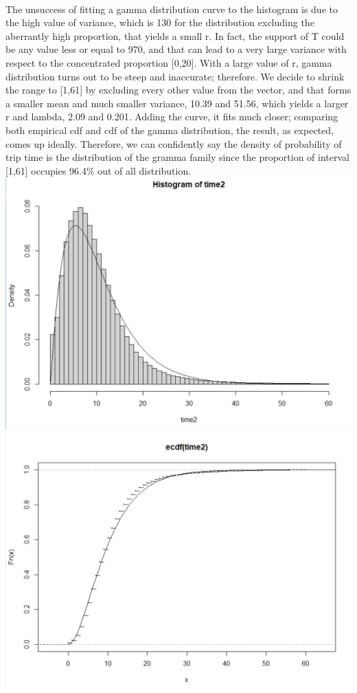 \documentclass[11pt]{article}
\begin{document}
\\
\par
The unsuccess of fitting a gamma distribution curve to the histogram is due to the high value of variance,
 which is 130 for the distribution excluding the aberrantly high proportion, that yields a small r. In fact,
 the support of T could be any value less or equal to 970, and that can lead to a very large variance with
 respect to the concentrated proportion [0,20]. With a large value of r, gamma distribution turns out to be
 steep and inaccurate; therefore. We decide to shrink the range to [1,61] by excluding every other value from
 the vector, and that forms a smaller mean and much smaller variance, 10.39 and 51.56, which yields a larger
 r and lambda, 2.09 and 0.201. Adding the curve, it fits much closer; comparing both empirical cdf and cdf of
 the gamma distribution, the result, as expected, comes up ideally. Therefore, we can confidently say the density
 of probability of trip time is the distribution of the gramma family since the proportion of interval [1,61]
 occupies 96.4\% out of all distribution.\\

\includegraphics[scale = .50]{hist_p1_3.png}\\
\includegraphics[scale = .50]{cdf_p1_3.png}\\
\end{document}
